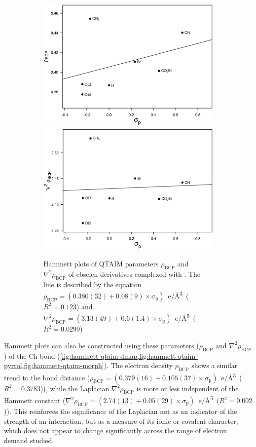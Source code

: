 \begin{refsection}
\begin{figure}
  \begin{subfigure}{\linewidth}
    \centering
    \includegraphics[width=0.45\linewidth]{Figures/hammett-rho-pyrrol-p.eps}
    \includegraphics[width=0.45\linewidth]{Figures/hammett-lapl-pyrrol-p.eps}
    \caption[Hammett plots of QTAIM parameters $\rho_\text{BCP}$ and $\nabla^2\rho_{\text{BCP}}$ of ebselen derivatives complexed with .]{Hammett plots of QTAIM parameters $\rho_\text{BCP}$ and $\nabla^2\rho_{\text{BCP}}$ of ebselen derivatives complexed with . The line is described by the equation $\rho_{\text{BCP}} = (0.380(32) + 0.08(9) \times \sigma_\text{p})$~e/\AA\textsuperscript{3}~($R^2=0.123$) and $\nabla^2\rho_{\text{BCP}} = (3.13(49) + 0.6(1.4) \times \sigma_\text{p})$~e/\AA\textsuperscript{5}~($R^2=0.0299$)}\label{fig:hammett-qtaim-pyrrol}
  \end{subfigure}
  
  \caption[Hammett plots of QTAIM parameters for ebselen derivatives complexed with various Lewis bases.]{}
  \end{figure}

Hammett plots can also be constructed using these parameters ($\rho_\text{BCP}$ and $\nabla^2\rho_{\text{BCP}}$) of the Ch bond (\cref{fig:hammett-qtaim-dmap,fig:hammett-qtaim-pyrrol,fig:hammett-qtaim-morph}).
The electron density $\rho_\text{BCP}$ shows a similar trend to the bond distance ($\rho_{\text{BCP}} = (0.379(16) + 0.105(37) \times \sigma_\text{p})$~e/\AA\textsuperscript{3}~($R^2=0.3783$)), while the Laplacian $\nabla^2\rho_{\text{BCP}}$ is more or less independent of the Hammett constant ($\nabla^2\rho_{\text{BCP}} = (2.74(13) + 0.05(29) \times \sigma_\text{p})$~e/\AA\textsuperscript{5}~($R^2=0.002$)).
This reinforces the significance of the Laplacian not as an indicator of the strength of an interaction, but as a measure of its ionic or covalent character, which does not appear to change significantly across the range of electron demand studied.


\end{refsection}
